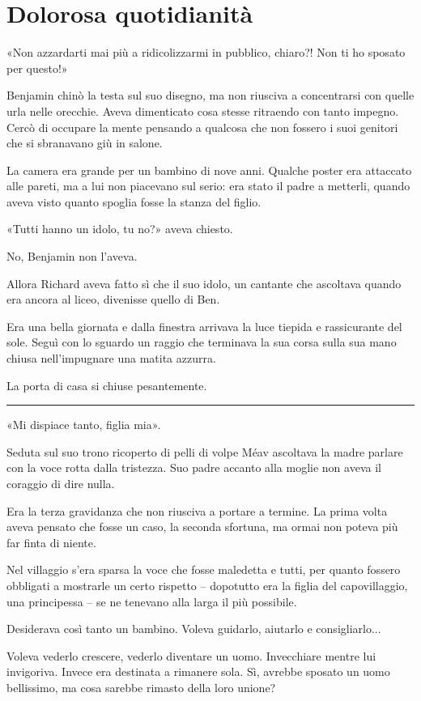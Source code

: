 \chapter{Dolorosa quotidianità}
\label{ch:dolorosa-quotidianita}

«Non azzardarti mai più a ridicolizzarmi in pubblico, chiaro?! Non ti ho sposato per questo!»

Benjamin chinò la testa sul suo disegno, ma non riusciva a concentrarsi con quelle urla nelle
orecchie. Aveva dimenticato cosa stesse ritraendo con tanto impegno. Cercò di occupare la mente
pensando a qualcosa che non fossero i suoi genitori che si sbranavano giù in salone.

La camera era grande per un bambino di nove anni. Qualche poster era attaccato alle pareti, ma a lui
non piacevano sul serio: era stato il padre a metterli, quando aveva visto quanto spoglia fosse la
stanza del figlio.

«Tutti hanno un idolo, tu no?» aveva chiesto.

No, Benjamin non l’aveva.

Allora Richard aveva fatto sì che il suo idolo, un cantante che ascoltava quando era ancora al
liceo, divenisse quello di Ben.

Era una bella giornata e dalla finestra arrivava la luce tiepida e rassicurante del sole. Seguì con
lo sguardo un raggio che terminava la sua corsa sulla sua mano chiusa nell’impugnare una matita
azzurra.

La porta di casa si chiuse pesantemente.

\plainbreak{1}

«Mi dispiace tanto, figlia mia».

Seduta sul suo trono ricoperto di pelli di volpe Méav ascoltava la madre parlare con la voce rotta
dalla tristezza. Suo padre accanto alla moglie non aveva il coraggio di dire nulla.

Era la terza gravidanza che non riusciva a portare a termine. La prima volta aveva pensato che fosse
un caso, la seconda sfortuna, ma ormai non poteva più far finta di niente.

Nel villaggio s'era sparsa la voce che fosse maledetta e tutti, per quanto fossero obbligati a
mostrarle un certo rispetto -- dopotutto era la figlia del capovillaggio, una principessa -- se ne
tenevano alla larga il più possibile.

Desiderava così tanto un bambino. Voleva guidarlo, aiutarlo e consigliarlo...

Voleva vederlo crescere, vederlo diventare un uomo. Invecchiare mentre lui invigoriva. Invece era
destinata a rimanere sola. Sì, avrebbe sposato un uomo bellissimo, ma cosa sarebbe rimasto della
loro unione?

